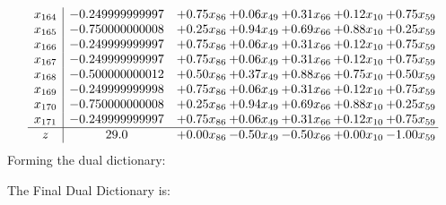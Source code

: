 \documentclass[8pt]{article}
\begin{document}
\[\begin{array}{c| c c@{\hskip 2pt} c@{\hskip 2pt} c@{\hskip 2pt} c@{\hskip 2pt} c@{\hskip 2pt} }
 x_{164}   &  -0.249999999997 & +  0.75 x_{86} & +  0.06 x_{49} & +  0.31 x_{66} & +  0.12 x_{10} & +  0.75 x_{59}\\
 x_{165}   &  -0.750000000008 & +  0.25 x_{86} & +  0.94 x_{49} & +  0.69 x_{66} & +  0.88 x_{10} & +  0.25 x_{59}\\
 x_{166}   &  -0.249999999997 & +  0.75 x_{86} & +  0.06 x_{49} & +  0.31 x_{66} & +  0.12 x_{10} & +  0.75 x_{59}\\
 x_{167}   &  -0.249999999997 & +  0.75 x_{86} & +  0.06 x_{49} & +  0.31 x_{66} & +  0.12 x_{10} & +  0.75 x_{59}\\
 x_{168}   &  -0.500000000012 & +  0.50 x_{86} & +  0.37 x_{49} & +  0.88 x_{66} & +  0.75 x_{10} & +  0.50 x_{59}\\
 x_{169}   &  -0.249999999998 & +  0.75 x_{86} & +  0.06 x_{49} & +  0.31 x_{66} & +  0.12 x_{10} & +  0.75 x_{59}\\
 x_{170}   &  -0.750000000008 & +  0.25 x_{86} & +  0.94 x_{49} & +  0.69 x_{66} & +  0.88 x_{10} & +  0.25 x_{59}\\
 x_{171}   &  -0.249999999997 & +  0.75 x_{86} & +  0.06 x_{49} & +  0.31 x_{66} & +  0.12 x_{10} & +  0.75 x_{59}\\
\hline
z    &  29.0 & +  0.00 x_{86} & -0.50 x_{49} & -0.50 x_{66} & +  0.00 x_{10} & -1.00 x_{59}\\
\end{array}\]
Forming the dual dictionary:

The Final Dual Dictionary is: 
\end{document}
